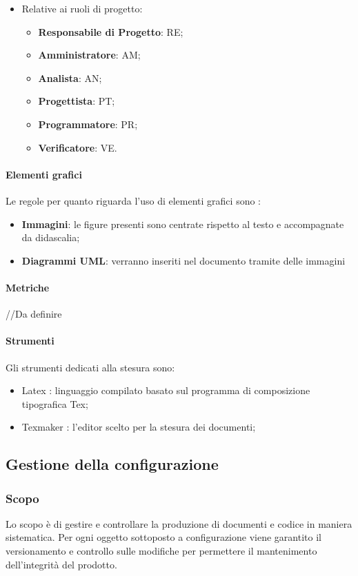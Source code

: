 \begin{itemize}
\begin{itemize}
    \item Relative ai ruoli di progetto:
        \begin{itemize}
        \item \textbf{Responsabile di Progetto}: RE;
        \item \textbf{Amministratore}: AM;
        \item \textbf{Analista}: AN;
        \item \textbf{Progettista}: PT;
        \item \textbf{Programmatore}: PR;
        \item \textbf{Verificatore}: VE.
        \end{itemize}
    \end{itemize}
\end{itemize}

\paragraph{Elementi grafici}
Le regole per quanto riguarda l’uso di elementi grafici sono :
\begin{itemize}
\item \textbf{Immagini}: le figure presenti sono centrate rispetto al testo e accompagnate da didascalia;
\item \textbf{Diagrammi UML}: verranno inseriti nel documento tramite delle immagini
\end{itemize}

\paragraph{Metriche}
//Da definire

\paragraph{Strumenti}
Gli strumenti dedicati alla stesura sono:
\begin{itemize}
\item Latex : linguaggio compilato basato sul programma di composizione tipografica Tex;
\item Texmaker : l’editor scelto per la stesura dei documenti;
\end{itemize}

\subsection{Gestione della configurazione}
\subsubsection{Scopo}
Lo scopo è di gestire e controllare la produzione di documenti e codice in maniera sistematica. Per ogni oggetto sottoposto a configurazione viene garantito il versionamento e controllo sulle modifiche per permettere il mantenimento dell'integrità del prodotto. 

